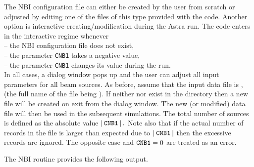The NBI configuration file can either be created by the user from
scratch or adjusted by editing one of the files of this type provided
with the code.
Another option is interactive creating/modification during the
Astra run.
The code enters in the interactive regime whenever\\
\hspace*{1em}-- the NBI configuration file does not exist,\\
\hspace*{1em}-- the parameter {\tt CNB1} takes a negative value,\\
\hspace*{1em}-- the parameter {\tt CNB1} changes its value during the run.\\
In all cases, a dialog window pops up and the user can adjust all input
parameters for all beam sources.
As before, assume that the input data file is , (the full
name of the file being ).
If neither  nor  exist in the directory
 then a new file  will be
created on exit from the dialog window.
The new (or modified) data file will then be used in the subsequent
simulations. 
The total number of sources is defined as the absolute value
$\left|\hspace*{2pt}{\tt CNB1}\hspace*{2pt}\right|.$ 
Note also that if the actual number of records in the file is larger
than expected due to $\left|\hspace*{2pt}{\tt CNB1}\hspace*{2pt}\right|$ then the excessive records
are ignored.
The opposite case and ${\tt CNB1}=0$ are treated as an error.


The NBI routine provides the following output.


